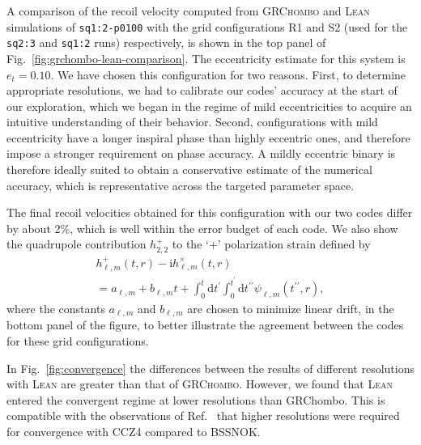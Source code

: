 \documentclass[floats,floatfix,showpacs,amssymb,physrev,twocolumn,superscriptaddress,reprint,
nofootinbib, longbibliography]{revtex4-2}
\newcommand{\rmd}{\mathrm{d}}
\begin{document}
A comparison of the recoil velocity computed from \textsc{GRChombo} 
and \textsc{Lean} simulations of \texttt{sq1:2-p0100} with the grid 
configurations R1 and S2 (used for the \texttt{sq2:3} and \texttt{sq1:2} runs) 
respectively, is shown in the top panel of Fig.~\ref{fig:grchombo-lean-comparison}.
The eccentricity estimate for this system is $e_t=0.10$. We have chosen
this configuration for two reasons. First, to determine appropriate
resolutions, we had to calibrate our codes' accuracy at the start of
our exploration, which we began in the regime of mild eccentricities to
acquire an intuitive understanding of their behavior. Second, 
configurations with mild eccentricity have a longer inspiral phase
than highly eccentric ones, and therefore impose a stronger requirement
on phase accuracy. A mildly eccentric binary is therefore ideally suited
to obtain a conservative estimate of the numerical accuracy, which is representative across the targeted parameter space.

The final recoil velocities obtained for this configuration with
our two codes differ by about 2\%, which is well within the error budget 
of each code.
We also show the quadrupole contribution
$h^+_{2,2}$ to the `+' polarization strain defined by \cite{Bishop:2016lgv}
\begin{multline}
    h^+_{\ell,m}(t,r)-\mathrm{i}h^\times_{\ell,m}(t,r) \\
    = a_{\ell,m} + b_{\ell,m}t + \int_0^t\rmd t^\prime\int_0^{t^\prime}
    \rmd t^{\prime\prime}\psi_{\ell,m}(t^{\prime\prime},r),
    \label{eq:strain}
\end{multline}
where the constants $a_{\ell,m}$ and $b_{\ell,m}$ are chosen to minimize 
linear drift,
in the bottom panel of the figure, to better illustrate the agreement
between the codes for these grid configurations.

In Fig.~\ref{fig:convergence} the differences between the results of 
different resolutions with \textsc{Lean} are greater than that of
\textsc{GRChombo}. However, we found that \textsc{Lean} entered the 
convergent regime at lower resolutions than GRChombo. This is compatible 
with the observations of Ref.~\cite{Alic:2011gg} that higher resolutions 
were required for convergence with CCZ4 compared to BSSNOK.




\end{document}
